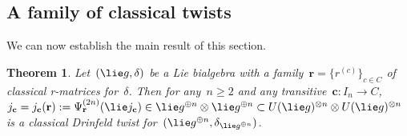 \documentclass[12pt, reqno]{amsart}
\newtheorem{theorem}{Theorem}[section]
\theoremstyle{definition}
\numberwithin{equation}{section}
\newcommand{\tensor}{\otimes}
\begin{document}
\subsection{A family of classical twists} We can now establish the main result of this section.
\begin{theorem}\label{thm:trans classical twists}
Let~$(\lie g,\delta)$ be a Lie bialgebra with a family~$
\mathbf r=\{r^{(c)}\}_{c\in C}$ of classical r-matrices for~$\delta$. Then for any~$n\ge 2$ and any
transitive~$\mathbf c:I_n\to C$, $j_{\mathbf c}=j_{\mathbf c}(\mathbf r):=\Psi_{\mathbf r}^{(2n)}(\lie j_{\mathbf c})\in \lie g^{\oplus n}\tensor \lie g^{\oplus n}\subset 
U(\lie g)^{\tensor n}\tensor U(\lie g)^{\tensor n}$ is a classical Drinfeld 
twist for~$(\lie g^{\oplus n},\delta_{\lie g^{\oplus n}})$.
\end{theorem}
\end{document}
